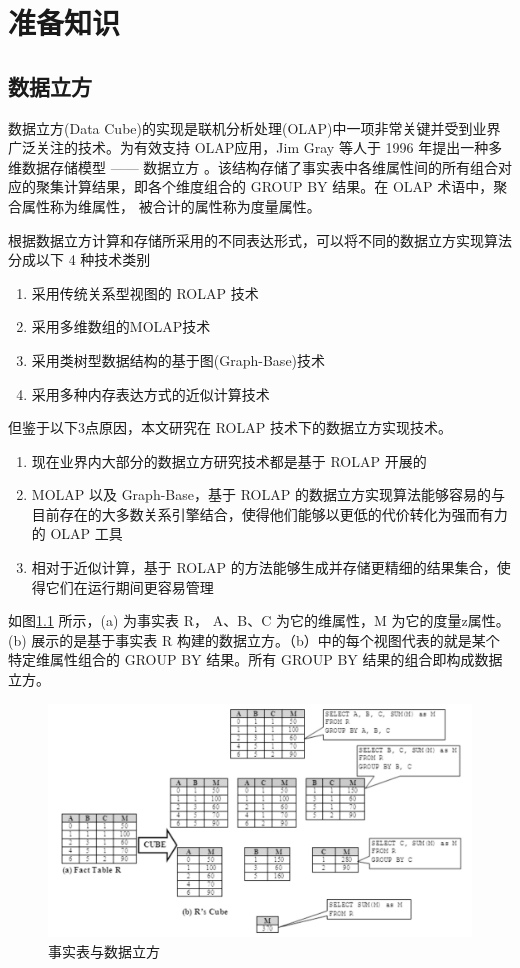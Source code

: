 \chapter{准备知识}

\section{数据立方}
数据立方(Data Cube)的实现是联机分析处理(OLAP)中一项非常关键并受到业界广泛关注的技术。为有效支持 OLAP应用，Jim Gray 等人于 1996 年提出一种多维数据存储模型 —— 数据立方 \cite{gray1997data}。该结构存储了事实表中各维属性间的所有组合对应的聚集计算结果，即各个维度组合的 GROUP BY 结果。在 OLAP 术语中，聚合属性称为维属性， 被合计的属性称为度量属性。

根据数据立方计算和存储所采用的不同表达形式，可以将不同的数据立方实现算法分成以下 4 种技术类别
\begin{enumerate}
\item 采用传统关系型视图的 ROLAP 技术 \cite{morfonios2007rolap}
\item 采用多维数组的MOLAP技术 \cite{zhao1997array}
\item 采用类树型数据结构的基于图(Graph-Base)技术 \cite{zhao2011graph}
\item 采用多种内存表达方式的近似计算技术 \cite{kamatdistributed}
\end{enumerate}

但鉴于以下3点原因，本文研究在 ROLAP 技术下的数据立方实现技术。
\begin{enumerate}
\item 现在业界内大部分的数据立方研究技术都是基于 ROLAP 开展的
\item MOLAP 以及 Graph-Base，基于 ROLAP 的数据立方实现算法能够容易的与目前存在的大多数关系引擎结合，使得他们能够以更低的代价转化为强而有力的 OLAP 工具
\item 相对于近似计算，基于 ROLAP 的方法能够生成并存储更精细的结果集合，使得它们在运行期间更容易管理
\end{enumerate}

如图\ref{fact_table_data_cube} 所示，(a) 为事实表 R， A、B、C 为它的维属性，M 为它的度量z属性。(b) 展示的是基于事实表 R 构建的数据立方。（b）中的每个视图代表的就是某个特定维属性组合的 GROUP BY 结果。所有 GROUP BY 结果的组合即构成数据立方。

\begin{figure}[!htb]
\centering\includegraphics[width=6in]{picture/ch_preliminary/fact_table_data_cube} 
\caption{事实表与数据立方}\label{fact_table_data_cube} 
\end{figure} 

